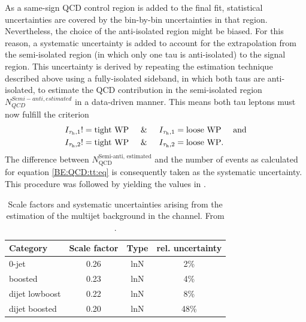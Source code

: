 As a same-sign QCD control region is added to the final fit, statistical uncertainties are covered by the bin-by-bin uncertainties in that region. Nevertheless, the choice of the anti-isolated region 
might be biased. For this reason, a systematic uncertainty is added to account for the extrapolation from the semi-isolated region (in which only one tau is anti-isolated) to the signal region.
This uncertainty is derived by repeating the estimation technique described above using a fully-isolated sideband, in which both taus are anti-isolated, to estimate the QCD contribution in the semi-isolated region $N_{QCD}^{Semi-anti, estimated}$ in a data-driven manner. This means both tau leptons must now fulfill the criterion
\begin{align}
    I_{\tau_\text{h},1} != \text{tight WP} \hspace*{0.5cm} \& \hspace*{0.5cm}  I_{\tau_\text{h},1} &= \text{loose WP}  \hspace*{0.5cm} \text{and} \\
    I_{\tau_\text{h},2} != \text{tight WP} \hspace*{0.5cm} \& \hspace*{0.5cm}  I_{\tau_\text{h},2} &= \text{loose WP}.
\end{align}
The difference between $N_\text{QCD}^\text{Semi-anti, estimated}$ and the number of events as calculated for equation \eqref{BE:QCD:tt:eq} is consequently taken as the systematic uncertainty. 
This procedure was followed by \cite{danny1} yielding the values in .

\begin{table}[!]
    \centering
    \caption{Scale factors and systematic uncertainties arising from the estimation of the multijet background in the \tautau{} channel. From \cite{danny1}.}\label{BE:tt:QCD_syst}
    \begin{tabular}{lccc}
        \toprule
        Category       & Scale factor & Type &  rel. uncertainty \\ \midrule
        0-jet          & 0.26 & lnN & 2\% \\
        boosted        & 0.23 & lnN & 4\% \\
        dijet lowboost & 0.22 & lnN & 8\% \\
        dijet boosted  & 0.20 & lnN & 48\% \\ \bottomrule
    \end{tabular}%
\end{table}%

